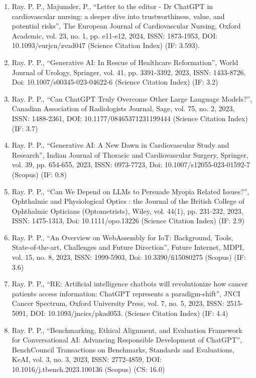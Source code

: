 \documentclass[11pt,a4paper]{moderncv}
\begin{document}
\begin{adjustwidth}{6em}{0pt}
\begin{enumerate}
		\item Ray. P. P., Majumder, P., “Letter to the editor - Dr ChatGPT in cardiovascular nursing: a deeper dive into trustworthiness, value, and potential risks”, The European Journal of Cardiovascular Nursing, Oxford Academic, vol. 23, no. 1, pp. e11-e12, 2024, ISSN: 1873-1953, DOI: 10.1093/eurjcn/zvad047 (Science Citation Index) (IF: 3.593). 
		
		\item Ray. P. P., “Generative AI: In Rescue of Healthcare Reformation”, World Journal of Urology, Springer, vol. 41, pp. 3391-3392, 2023, ISSN: 1433-8726, Doi: 10.1007/s00345-023-04622-6 (Science Citation Index) (IF: 3.2)
		
		\item Ray. P. P., “Can ChatGPT Truly Overcome Other Large Language Models?”, Canadian Association of Radiologists Journal, Sage, vol. 75, no. 2, 2023, ISSN: 1488-2361, DOI: 10.1177/08465371231199444 (Science Citation Index) (IF: 3.7)
		
		\item Ray. P. P., “Generative AI: A New Dawn in Cardiovascular Study and Research”, Indian Journal of Thoracic and Cardiovascular Surgery, Springer, vol. 39, pp. 654-655, 2023, ISSN: 0973-7723, Doi: 10.1007/s12055-023-01592-7 (Scopus) (IF: 0.8)
		
		\item Ray. P. P., “Can We Depend on LLMs to Persuade Myopia Related Issues?”, Ophthalmic and Physiological Optics : the Journal of the British College of Ophthalmic Opticians (Optometrists), Wiley, vol. 44(1), pp. 231-232, 2023, ISSN: 1475-1313, Doi: 10.1111/opo.13226 (Science Citation Index) (IF: 2.9)
		
		\item Ray. P. P., “An Overview on WebAssembly for IoT: Background, Tools, State-of-the-art, Challenges and Future Direction”, Future Internet, MDPI, vol. 15, no. 8, 2023, ISSN: 1999-5903, Doi: 10.3390/fi15080275 (Scopus) (IF: 3.6)
		
		\item Ray. P. P., “RE: Artificial intelligence chatbots will revolutionize how cancer patients access information: ChatGPT represents a paradigm-shift”, JNCI Cancer Spectrum, Oxford University Press, vol. 7, no. 5, 2023, ISSN: 2515-5091, DOI: 10.1093/jncics/pkad053. (Science Citation Index) (IF: 4.4)
		
		\item Ray. P. P., “Benchmarking, Ethical Alignment, and Evaluation Framework for Conversational AI: Advancing Responsible Development of ChatGPT”, BenchCouncil Transactions on Benchmarks, Standards and Evaluations, KeAI, vol. 3, no. 3, 2023, ISSN: 2772-4859, DOI: 10.1016/j.tbench.2023.100136 (Scopus) (CS: 16.0)
		

\end{enumerate}
\end{adjustwidth}
\end{document}
